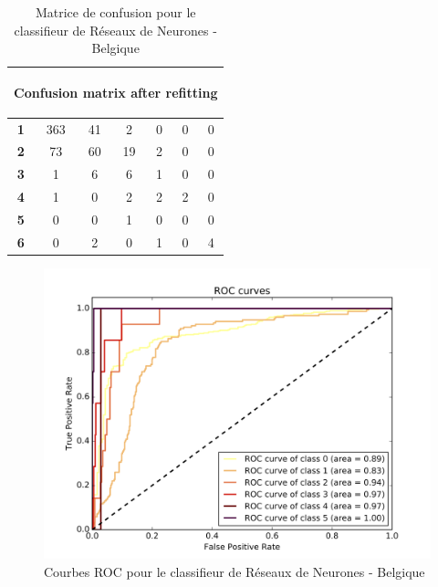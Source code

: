 \documentclass{book}
\begin{document}
\begin{table}[H]
  \begin{center}
  \begin{adjustbox}{max width=\textwidth}
  \begin{tabular}{|c|c|c|c|c|c|c|}
    \hline
    \multicolumn{7}{|c|}{{ \begin{bf}Confusion matrix after refitting\end{bf}}} \\
    \hline
    \textbf{1} & 363 & 41 & 2 & 0 & 0 & 0\\
    \hline
    \textbf{2} & 73 & 60 & 19 & 2 & 0 & 0\\
    \hline
    \textbf{3} & 1 & 6 & 6 & 1 & 0 & 0\\
    \hline
    \textbf{4} & 1 & 0 & 2 & 2 & 2 & 0\\
    \hline
    \textbf{5} & 0 & 0 & 1 & 0 & 0 & 0\\
    \hline
    \textbf{6} & 0 & 2 & 0 & 1 & 0 & 4\\
    \hline
  \end{tabular}
  \end{adjustbox}
  \end{center}
  \caption{Matrice de confusion pour le classifieur de Réseaux de Neurones - Belgique}
  \label{nn_cm_belgique}
\end{table}

\begin{figure}[H]
 \begin{center}
\includegraphics[scale=0.4]{../../data/Belgique/test/Neural_Network_Classification-oversampling/Neural_Network_Classification-oversampling_roc.png}
 \end{center}
 \caption{Courbes ROC pour le classifieur de Réseaux de Neurones - Belgique}
 \label{nn_roc_belgique}
\end{figure}
\end{document}
